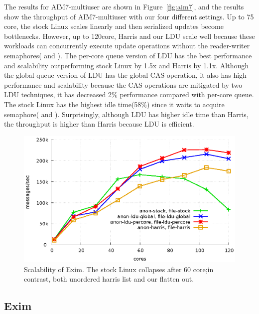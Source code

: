 The results for AIM7-multiuser are shown in Figure~\ref{fig:aim7}, and the
results show the throughput of AIM7-multiuser with our four different settings.
Up to 75 core, the stock Linux scales linearly and then serialized updates
become bottlenecks.
However, up to 120core, Harris and our LDU scale well because
these workloads can concurrently execute update operations without the
reader-writer semaphores( and ).
The per-core queue version of LDU has the best performance and
scalability outperforming stock Linux by 1.5x and Harris by
1.1x.
Although the global queue version of LDU has the global CAS operation, it
also has high performance and scalability because the CAS operations are
mitigated by two LDU techniques, it has decreased 2\% performance compared with
per-core queue.
The stock Linux has the highest idle time(58\%) since it waits to acquire
semaphore( and ).
Surprisingly, although LDU has higher idle time than Harris, the throughput is
higher than Harris because LDU is efficient.
\begin{figure}[tb]
  \begin{center}
    \includegraphics[scale=0.65]{graph/exim.eps}
  \end{center}
  \caption{Scalability of Exim. The stock Linux collapses after 60 core;in
  contrast, both unordered harris list and our  flatten out.}
  \label{fig:exim}
\end{figure}
\subsection{Exim}

